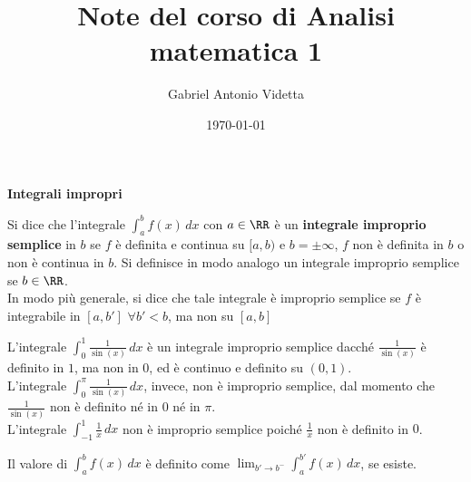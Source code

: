 \documentclass[11pt]{article}
\title{\textbf{Note del corso di Analisi matematica 1}}
\author{Gabriel Antonio Videtta}
\date{\today}
\begin{document}
	
	\maketitle
	
	\begin{center}
		\Large \textbf{Integrali impropri}
	\end{center}

	\wip
	
	
	\begin{definition} 
		Si dice che l'integrale $\int_a^b f(x) \, dx$ con $a \in \RR$ è un
		\textbf{integrale improprio semplice} in $b$ se
		$f$ è definita e continua su $[a, b)$ e $b = \pm\infty$,
		$f$ non è definita in $b$ o non è continua in $b$. Si
		definisce in modo analogo un integrale improprio semplice se $b \in \RR$. \\ 
		
		In modo più
		generale, si dice che tale integrale è improprio semplice
		se $f$ è integrabile in $[a, b']$ $\forall b' < b$, ma non su
		$[a, b]$
	\end{definition}

	\begin{example}\nl
		\li L'integrale $\int_0^1 \frac{1}{\sin(x)} \, dx$ è un
		integrale improprio semplice dacché $\frac{1}{\sin(x)}$ è
		definito in $1$, ma non in $0$, ed è continuo e definito su $(0, 1)$. \\
		
		\li L'integrale $\int_0^\pi \frac{1}{\sin(x)} \, dx$, invece,
		non è improprio semplice, dal momento che $\frac{1}{\sin(x)}$ non
		è definito né in $0$ né in $\pi$. \\
		
		\li L'integrale $\int_{-1}^1 \frac{1}{x} \, dx$ non è improprio semplice
		poiché $\frac{1}{x}$ non è definito in $0$.
	\end{example}

	\begin{definition}
		Il valore di $\int_a^b f(x) \, dx$ è definito come $\lim_{b' \to b^-} \int_a^{b'} f(x) \, dx$, se esiste.
	\end{definition}
\end{document}
